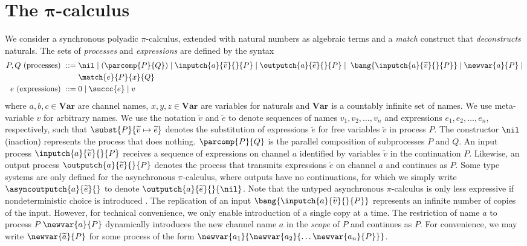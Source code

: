 \chapter{The $\mathbf{\pi}$-calculus}\label{sec:picalc}
We consider a synchronous polyadic $\pi$-calculus, extended with natural numbers as algebraic terms and a \textit{match} construct that \textit{deconstructs} naturals. The sets of \textit{processes} and \textit{expressions} are defined by the syntax
%
\begin{align*}
    P,Q \text{ (processes) } ::=&\; \nil \mid \left(\parcomp{P}{Q} \right) \mid \inputch{a}{\widetilde{v}}{}{P} \mid \outputch{a}{\widetilde{e}}{}{P} \mid\; \bang{\inputch{a}{\widetilde{v}}{}{P}} \mid \newvar{a}{P} \mid  \\
    &\; \match{e}{P}{x}{Q}\\
    e \text{ (expressions) } ::=&\; 0 \mid \succc{e} \mid v
\end{align*}
%
where $a,b,c \in \mathbf{Var}$ are channel names, $x,y,z\in\textbf{Var}$ are variables for naturals and $\mathbf{Var}$ is a countably infinite set of names. We use meta-variable $v$ for arbitrary names. We use the notation $\widetilde{v}$ and $\widetilde{e}$ to denote sequences of names $v_1,v_2,\dots,v_n$ and expressions $e_1,e_2,\dots,e_n$, respectively, such that $\subst{P}{\widetilde{v}\mapsto\widetilde{e}}$ denotes the substitution of expressions $\widetilde{e}$ for free variables $\widetilde{v}$ in process $P$. The constructor $\nil$ (inaction) represents the process that does nothing. $\parcomp{P}{Q}$ is the parallel composition of subprocesses $P$ and $Q$. An input process $\inputch{a}{\widetilde{v}}{}{P}$ receives a sequence of expressions on channel $a$ identified by variables $\widetilde{v}$ in the continuation $P$. Likewise, an output process $\outputch{a}{\widetilde{e}}{}{P}$ denotes the process that transmits expressions $\widetilde{e}$ on channel $a$ and continues as $P$. Some type systems are only defined for the asynchronous $\pi$-calculus, where outputs have no continuations, for which we simply write $\asyncoutputch{a}{\widetilde{e}}{}$ to denote $\outputch{a}{\widetilde{e}}{}{\nil}$. Note that the untyped asynchronous $\pi$-calculus is only less expressive if nondeterministic choice is introduced \cite{Palamidessi1997}. The replication of an input $\bang{\inputch{a}{\widetilde{v}}{}{P}}$ represents an infinite number of copies of the input. However, for technical convenience, we only enable introduction of a single copy at a time. The restriction of name $a$ to process $P$ $\newvar{a}{P}$ dynamically introduces the new channel name $a$ in the \textit{scope} of $P$ and continues as $P$. For convenience, we may write $\newvar{\widetilde{a}}{P}$ for some process of the form $\newvar{a_1}{\newvar{a_2}{\dots\newvar{a_n}{P}}}$.\\ %
